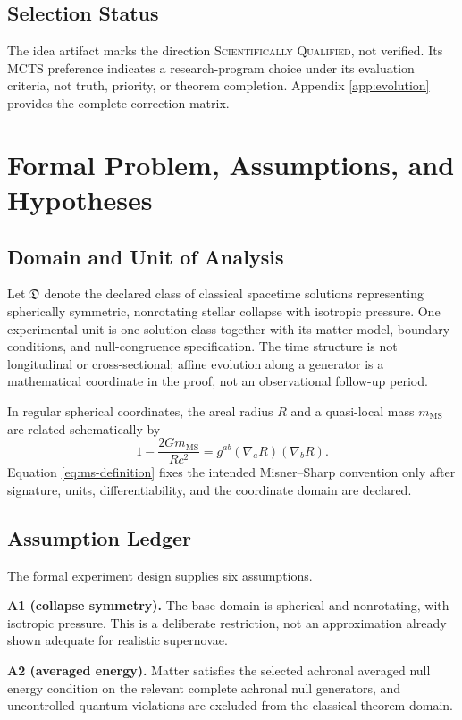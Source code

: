 \documentclass[conference]{IEEEtran}
\begin{document}
\subsection{Selection Status}
The idea artifact marks the direction \textsc{Scientifically Qualified}, not verified. Its MCTS preference indicates a research-program choice under its evaluation criteria, not truth, priority, or theorem completion. Appendix \ref{app:evolution} provides the complete correction matrix.

\section{Formal Problem, Assumptions, and Hypotheses}
\label{sec:formal}

\subsection{Domain and Unit of Analysis}
Let $\mathfrak{D}$ denote the declared class of classical spacetime solutions representing spherically symmetric, nonrotating stellar collapse with isotropic pressure. One experimental unit is one solution class together with its matter model, boundary conditions, and null-congruence specification. The time structure is not longitudinal or cross-sectional; affine evolution along a generator is a mathematical coordinate in the proof, not an observational follow-up period.

In regular spherical coordinates, the areal radius $R$ and a quasi-local mass $m_{\mathrm{MS}}$ are related schematically by
\begin{equation}
1-\frac{2Gm_{\mathrm{MS}}}{Rc^2}
=g^{ab}(\nabla_aR)(\nabla_bR).
\label{eq:ms-definition}
\end{equation}
Equation \eqref{eq:ms-definition} fixes the intended Misner--Sharp convention only after signature, units, differentiability, and the coordinate domain are declared.

\subsection{Assumption Ledger}
The formal experiment design supplies six assumptions.

\textbf{A1 (collapse symmetry).} The base domain is spherical and nonrotating, with isotropic pressure. This is a deliberate restriction, not an approximation already shown adequate for realistic supernovae.

\textbf{A2 (averaged energy).} Matter satisfies the selected achronal averaged null energy condition on the relevant complete achronal null generators, and uncontrolled quantum violations are excluded from the classical theorem domain.
\end{document}
